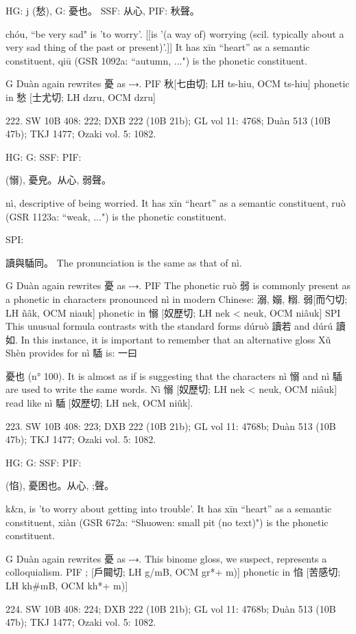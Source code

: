 {HG: j (愁),
G:	憂也。
SSF: 从心,
PIF: 秋聲。


chóu, ``be very sad"
is 'to worry'. [[is '(a way of) worrying (scil. typically about a very sad thing of the past or present)'.]]
It has xīn ``heart'' as a semantic constituent,
qiū (GSR 1092a: ``autumn, ...") is the phonetic constituent.

G	Duàn again rewrites 憂 as ⤏.
PIF     秋[七由切; LH ts-hiu, OCM ts-hiu] phonetic in 愁 [士尤切; LH dzru, OCM dzru]

222. SW 10B 408: 222; DXB 222 (10B 21b); GL vol 11: 4768; Duàn 513 (10B 47b); TKJ 1477; Ozaki vol. 5: 1082.


HG:
G: SSF: PIF:

(愵),
憂皃。从心, 弱聲。

nì,
descriptive of being worried.
It has xīn ``heart'' as a semantic constituent,
ruò (GSR 1123a: ``weak, ...") is the phonetic constituent.

SPI:

讀與䮢同。 The pronunciation is the same as that of nì.

G	Duàn again rewrites 憂 as ⤏.
PIF     The phonetic ruò 弱 is commonly present as a phonetic in characters pronounced nì in modern Chinese: 溺, 嫋, 糑.
弱[而勺切; LH ñâk, OCM niauk] phonetic in 愵 [奴歷切; LH nek < neuk, OCM niâuk]
SPI     This unusual formula contrasts with the standard forms dúruò 讀若 and dúrú 讀如. In this instance, it is important to remember that an alternative gloss Xǔ Shèn provides for nì 䮢 is: 一曰



憂也 (n° 100). It is almost as if is suggesting that the characters nì 愵 and nì 䮢 are used to write the same words.
Nì 愵 [奴歷切; LH nek < neuk, OCM niâuk] read like nì 䮢 [奴歷切; LH nek, OCM niûk].

223. SW 10B 408: 223; DXB 222 (10B 21b); GL vol 11: 4768b; Duàn 513 (10B 47b); TKJ 1477; Ozaki vol. 5: 1082.


HG:
G: SSF: PIF:

(惂),
憂困也。从心,
;聲。

k&n,
is 'to worry about getting into trouble'.
It has xīn ``heart'' as a semantic constituent,
xiàn (GSR 672a: ``Shuowen: small pit (no text)") is the phonetic constituent.

G	Duàn again rewrites 憂 as ⤏. This binome gloss, we suspect, represents a colloquialism.
PIF     ; [戶䦤切; LH g/mB, OCM gr*+ m)] phonetic in 惂 [苦感切; LH kh\#mB, OCM kh*+ m)]

224. SW 10B 408: 224; DXB 222 (10B 21b); GL vol 11: 4768b; Duàn 513 (10B 47b); TKJ 1477; Ozaki vol. 5: 1082.

}
